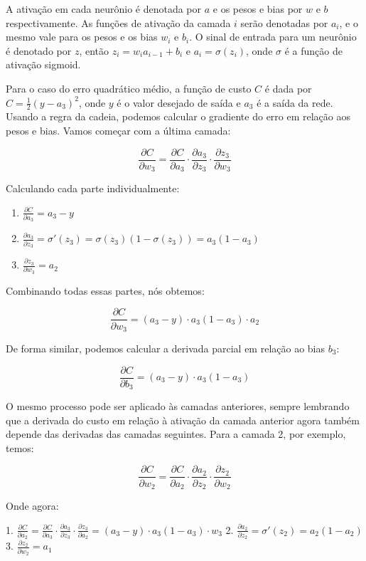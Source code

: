 \documentclass[12pt,a4paper, brazil]{article}
\begin{document}
A ativação em cada neurônio é denotada por $a$ e os pesos e bias por $w$ e $b$ respectivamente. As funções de ativação da camada $i$ serão denotadas por $a_i$, e o mesmo vale para os pesos e os bias $w_i$ e $b_i$. O sinal de entrada para um neurônio é denotado por $z$, então $z_i = w_i a_{i-1} + b_i$ e $a_i = \sigma(z_i)$, onde $\sigma$ é a função de ativação sigmoid.

Para o caso do erro quadrático médio, a função de custo $C$ é dada por $C = \frac{1}{2}(y - a_3)^2$, onde $y$ é o valor desejado de saída e $a_3$ é a saída da rede. Usando a regra da cadeia, podemos calcular o gradiente do erro em relação aos pesos e bias. Vamos começar com a última camada:

$$\frac{\partial C}{\partial w_3} = \frac{\partial C}{\partial a_3} \cdot \frac{\partial a_3}{\partial z_3} \cdot \frac{\partial z_3}{\partial w_3}$$

\noindent Calculando cada parte individualmente:

\begin{enumerate}
\item $\frac{\partial C}{\partial a_3} = a_3 - y$
\item $\frac{\partial a_3}{\partial z_3} = \sigma'(z_3) = \sigma(z_3)(1 - \sigma(z_3)) = a_3(1 - a_3)$
\item $\frac{\partial z_3}{\partial w_3} = a_2$
\end{enumerate}

\noindent Combinando todas essas partes, nós obtemos:

$$\frac{\partial C}{\partial w_3} = (a_3 - y) \cdot a_3(1 - a_3) \cdot a_2$$

\noindent De forma similar, podemos calcular a derivada parcial em relação ao bias $b_3$:

$$\frac{\partial C}{\partial b_3} = (a_3 - y) \cdot a_3(1 - a_3)$$

\noindent O mesmo processo pode ser aplicado às camadas anteriores, sempre lembrando que a derivada do custo em relação à ativação da camada anterior agora também depende das derivadas das camadas seguintes. Para a camada 2, por exemplo, temos:

$$\frac{\partial C}{\partial w_2} = \frac{\partial C}{\partial a_2} \cdot \frac{\partial a_2}{\partial z_2} \cdot \frac{\partial z_2}{\partial w_2}$$

\noindent Onde agora:

1. $\frac{\partial C}{\partial a_2} = \frac{\partial C}{\partial a_3} \cdot \frac{\partial a_3}{\partial z_3} \cdot \frac{\partial z_3}{\partial a_2} = (a_3 - y) \cdot a_3(1 - a_3) \cdot w_3$
2. $\frac{\partial a_2}{\partial z_2} = \sigma'(z_2) = a_2(1 - a_2)$
3. $\frac{\partial z_2}{\partial w_2} = a_1$
\end{document}
